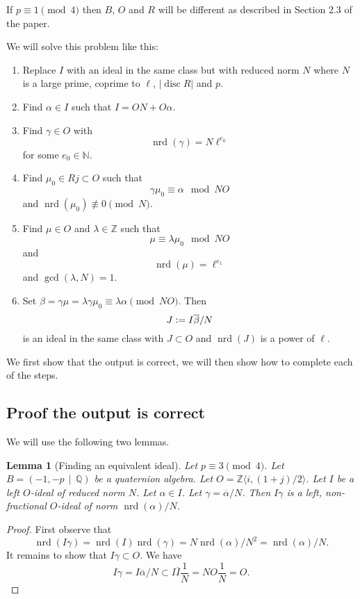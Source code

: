 \documentclass[10pt]{article}
\theoremstyle{plain}
\newtheorem{lemma}[theorem]{Lemma}
\theoremstyle{definition}
\newcommand{\op}{\operatorname}
\newcommand{\N}{\mathbb{N}}
\newcommand{\Z}{\mathbb{Z}}
\newcommand{\Q}{\mathbb{Q}}
\newcommand{\nrd}{\op{nrd}}
\newcommand{\disc}{\op{disc}}
\begin{document}
If \( p \equiv 1 \pmod{4} \) then \( B \), \( O \) and \( R \) will be different as described in Section 2.3 of the paper.

We will solve this problem like this:
\begin{enumerate}
    \item
          Replace \( I \) with an ideal in the same class but with reduced norm \( N \) where \( N \) is a large prime, coprime to \( \ell \), \( |\disc R| \) and \( p \).
    \item
          Find \( \alpha \in I \) such that \( I = ON + O\alpha \).
    \item
          Find \( \gamma \in O \) with \[ \nrd(\gamma) = N \ell^{e_0} \] for some \( e_0 \in \N \).
    \item
          Find \( \mu_0 \in Rj \subset  O \) such that \[ \gamma\mu_0 \equiv \alpha \mod NO \] and \( \nrd(\mu_0) \not\equiv 0 \pmod{N} \).
    \item
          Find \( \mu \in  O \) and \( \lambda \in \Z \) such that \[ \mu \equiv \lambda \mu_0 \mod NO \] and \[ \nrd(\mu) = \ell^{e_1} \] and \( \gcd(\lambda, N) = 1 \).
    \item
          Set \( \beta = \gamma \mu = \lambda\gamma\mu_0 \equiv \lambda \alpha \pmod{NO} \).
          Then \[ J \vcentcolon = I\overline{\beta}/N \] is an ideal in the same class with \( J \subset O \) and \( \nrd(J) \) is a power of \( \ell \).
\end{enumerate}

We first show that the output is correct, we will then show how to complete each of the steps.

\subsection{Proof the output is correct}
We will use the following two lemmas.
\begin{lemma}[Finding an equivalent ideal] \label{lem: change norm}
    Let \( p \equiv 3 \pmod{4} \).
    Let \( B =  (-1, -p \, \mid \, \Q) \) be a quaternion algebra.
    Let \( O = \Z \langle i, (1+j) / 2 \rangle \).
    Let \( I \) be a left \( O \)-ideal of reduced norm \( N \).
    Let \( \alpha \in I \).
    Let \( \gamma = \overline{\alpha} / N \).
    Then \( I \gamma \) is a left, non-fractional \( O \)-ideal of norm \( \nrd(\alpha) / N \).
\end{lemma}
\begin{proof}
    First observe that
    \[
        \nrd(I \gamma) = \nrd(I)\nrd(\gamma) = N \nrd(\alpha) / N^2 = \nrd(\alpha) / N.
    \]
    It remains to show that \( I\gamma \subset O \).
    We have
    \[
        I\gamma = I\overline{\alpha} / N \subset I\overline{I} \frac{1}{N} = NO \frac{1}{N} = O.
    \]
\end{proof}
\end{document}
